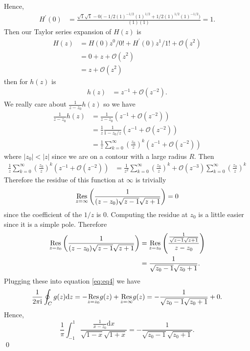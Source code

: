 \documentclass[10pt]{amsart}
\newcommand{\D}{\mathrm{d}}
\newcommand{\I}{\mathrm{i}}
\theoremstyle{nonumberplain}
\begin{document}
\begin{enumerate}[label={\bf {\arabic*}:}]
\begin{enumerate}
\begin{align*}
\end{align*}
Hence,
\begin{align*}
H^\prime(0) &= \frac {\sqrt {1} \sqrt {1} - 0\big(-1/2(1)^{-1/2}(1)^{1/2} +1/2(1)^{1/2}(1)^{-1/2} \big)}{ (1)(1)} = 1.
\end{align*}
Then our Taylor series expansion of $H(z)$ is
\begin{align*}
H(z) &= H(0) z^0 /0! + H^\prime(0) z^1 /1! + \mathcal O (z^2) \\
	&= 0 + z + \mathcal O (z^2) \\
	&= z + \mathcal O (z^2)
\end{align*}
then for $h(z)$ is
\begin{align*}
h(z) &= z^{-1} + \mathcal O (z^{-2}).
\end{align*}
We really care about $\frac 1 {z - z_0} h(z)$ so we have
\begin{align*}
\frac 1 {z - z_0} h(z) &= \frac 1 {z - z_0} \left( z^{-1} + \mathcal O (z^{-2})\right) \\
	&= \frac 1 {z} \frac 1 {1 - z_0/z} \left( z^{-1} + \mathcal O (z^{-2})\right) \\
	&= \frac 1 {z} \sum_{k=0}^\infty \left(\frac {z_0} z\right)^k \left( z^{-1} + \mathcal O (z^{-2})\right)
\end{align*}
where $|z_0| < |z|$ since we are on a contour with a large radius $R$.
Then
\begin{align*}
\frac 1 {z} \sum_{k=0}^\infty \left(\frac {z_0} z\right)^k \left( z^{-1} + \mathcal O (z^{-2})\right)
	&=  \frac 1 {z^2} \sum_{k=0}^\infty \left(\frac {z_0} z\right)^k + \mathcal O (z^{-3}) \sum_{k=0}^\infty \left(\frac {z_0} z\right)^k
\end{align*}
Therefore the residue of this function at $\infty$ is trivially
$$
\underset{z=\infty}{{\rm Res}} \left( \frac 1 {(z - z_0) \sqrt {z - 1} \sqrt {z + 1}} \right) = 0
$$
since the coefficient of the $1/z$ is 0.
Computing the residue at $z_0$ is a little easier since it is a simple pole.
Therefore
\begin{align*}
\underset{z=z_0}{{\rm Res}} \left( \frac 1 {(z - z_0) \sqrt {z - 1} \sqrt {z + 1}} \right)
	& = \underset{z=z_0}{{\rm Res}} \left( \frac {\frac 1 {\sqrt {z - 1} \sqrt {z + 1}}} {z - z_0} \right) \\
	& = \frac 1 {\sqrt {z_0 - 1} \sqrt {z_0 + 1}}.
\end{align*}
Plugging these into equation \eqref{eq:eq4} we have
$$
\frac 1 {2 \pi \I} \oint_C g(z) \D z
	= - \underset{z=z_0}{{\rm Res}} g(z)  + \underset{z=\infty}{{\rm Res}} g(z) = - \frac 1 {\sqrt {z_0 - 1} \sqrt {z_0 + 1}} + 0.
$$
Hence,
$$
\frac 1 \pi \int_{-1}^1 \frac {\frac 1 {x - z_0}\D x} {\sqrt {1 - x} \sqrt {1 + x}}
	= - \frac 1 {\sqrt {z_0 - 1} \sqrt {z_0 + 1}}.
$$
\qed \\


\end{enumerate}
\end{enumerate}
\end{document}
